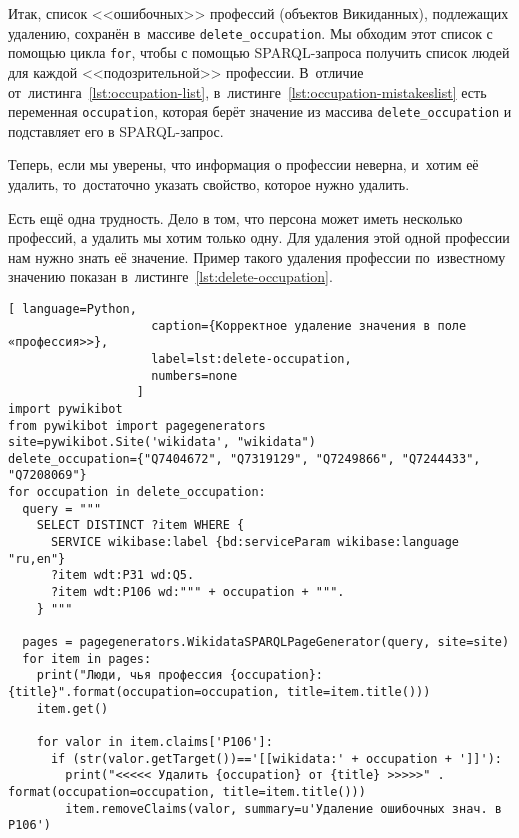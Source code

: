 Итак, список <<ошибочных>> профессий (объектов Викиданных), подлежащих удалению, 
сохранён в~массиве \lstinline|delete_occupation|. 
Мы обходим этот список с помощью цикла \lstinline|for|, 
чтобы с помощью SPARQL-запроса получить список людей для каждой <<подозрительной>> профессии. 
В~отличие от~листинга~\ref{lst:occupation-list}, 
в~листинге~\ref{lst:occupation-mistakeslist} есть переменная \lstinline|occupation|, 
которая берёт значение из массива \lstinline|delete_occupation| и подставляет его в SPARQL-запрос.

Теперь, если мы уверены, что информация о профессии неверна, 
и~хотим её удалить, то~достаточно указать свойство, которое нужно удалить.

Есть ещё одна трудность. 
Дело в том, что персона может иметь несколько профессий, а удалить мы хотим только одну. 
Для удаления этой одной профессии нам нужно знать её значение. 
Пример такого удаления профессии по~известному значению 
показан в~листинге~\ref{lst:delete-occupation}. 



\newpage
{}
\begin{lstlisting}[ language=Python,
                    caption={Корректное удаление значения в поле «профессия>>},
                    label=lst:delete-occupation, 
                    numbers=none
                  ]
import pywikibot
from pywikibot import pagegenerators
site=pywikibot.Site('wikidata', "wikidata")
delete_occupation={"Q7404672", "Q7319129", "Q7249866", "Q7244433", 
"Q7208069"}
for occupation in delete_occupation:
  query = """
    SELECT DISTINCT ?item WHERE {
      SERVICE wikibase:label {bd:serviceParam wikibase:language "ru,en"}
      ?item wdt:P31 wd:Q5.
      ?item wdt:P106 wd:""" + occupation + """.
    } """

  pages = pagegenerators.WikidataSPARQLPageGenerator(query, site=site)
  for item in pages:
    print("Люди, чья профессия {occupation}: {title}".format(occupation=occupation, title=item.title()))
    item.get()

    for valor in item.claims['P106']:
      if (str(valor.getTarget())=='[[wikidata:' + occupation + ']]'):
        print("<<<<< Удалить {occupation} от {title} >>>>>" . format(occupation=occupation, title=item.title()))
        item.removeClaims(valor, summary=u'Удаление ошибочных знач. в P106')
\end{lstlisting} 

